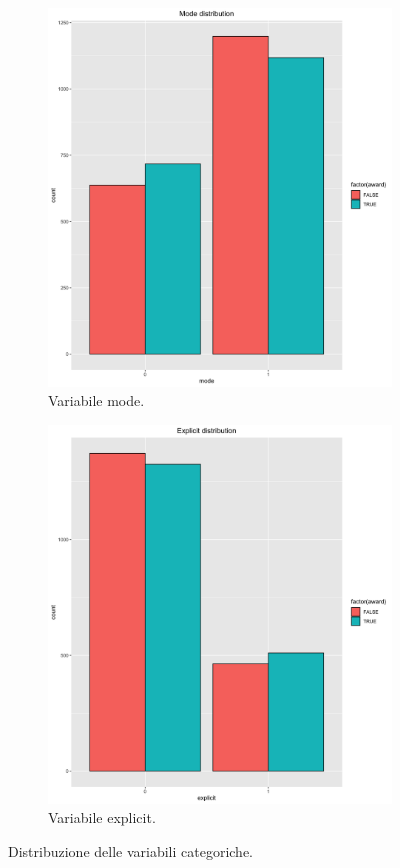 \begin{figure}[!h]
	\begin{subfigure}[b]{0.3\textwidth}
		\centering
		\hspace*{-2cm}   
		\includegraphics[width=10cm]{../images/mode_distribution.png}
		\caption{Variabile mode.}
	\end{subfigure}
	\hfill
	\begin{subfigure}[b]{0.6\textwidth}
		\centering
		\includegraphics[width=10cm]{../images/explicit_distribution.png}
		\caption{Variabile explicit.}
	\end{subfigure}%
	\caption{Distribuzione delle variabili categoriche.}
\end{figure}

